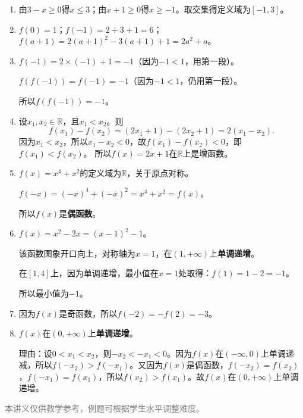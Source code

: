 \documentclass[12pt, a4paper]{ctexart}
\begin{document}
\vspace{20pt}

\begin{knowledgebox}[参考答案]
\begin{enumerate}[leftmargin=2em, label=\textbf{\arabic*.}]

  \item 由$3-x\geq 0$得$x\leq 3$；由$x+1\geq 0$得$x\geq -1$。取交集得定义域为$[-1,3]$。

  \item $f(0)=1$；$f(-1)=2+3+1=6$；$f(a+1)=2(a+1)^2-3(a+1)+1=2a^2+a$。

  \item $f(-1)=2\times(-1)+1=-1$（因为$-1<1$，用第一段）。

  $f(f(-1))=f(-1)=-1$（因为$-1<1$，仍用第一段）。

  所以$f(f(-1))=-1$。

  \item 设$x_1,x_2\in\mathbb{R}$，且$x_1<x_2$。则
  \[f(x_1)-f(x_2)=(2x_1+1)-(2x_2+1)=2(x_1-x_2).\]
  因为$x_1<x_2$，所以$x_1-x_2<0$，故$f(x_1)-f(x_2)<0$，即$f(x_1)<f(x_2)$。
  所以$f(x)=2x+1$在$\mathbb{R}$上是增函数。

  \item $f(x)=x^4+x^2$的定义域为$\mathbb{R}$，关于原点对称。

  $f(-x)=(-x)^4+(-x)^2=x^4+x^2=f(x)$。

  所以$f(x)$是\textbf{偶函数}。

  \item $f(x)=x^2-2x=(x-1)^2-1$。

  该函数图象开口向上，对称轴为$x=1$，在$(1,+\infty)$上\textbf{单调递增}。

  在$[1,4]$上，因为单调递增，最小值在$x=1$处取得：$f(1)=1-2=-1$。

  所以最小值为$-1$。

  \item 因为$f(x)$是奇函数，所以$f(-2)=-f(2)=-3$。

  \item $f(x)$在$(0,+\infty)$上\textbf{单调递增}。

  理由：设$0<x_1<x_2$，则$-x_2<-x_1<0$。因为$f(x)$在$(-\infty,0)$上单调递减，所以$f(-x_2)>f(-x_1)$。又因为$f(x)$是偶函数，$f(-x_2)=f(x_2)$，$f(-x_1)=f(x_1)$，所以$f(x_2)>f(x_1)$。故$f(x)$在$(0,+\infty)$上单调递增。

\end{enumerate}
\end{knowledgebox}

\vfill
\begin{center}
\small\textcolor{gray}{本讲义仅供教学参考，例题可根据学生水平调整难度。}
\end{center}
\end{document}
